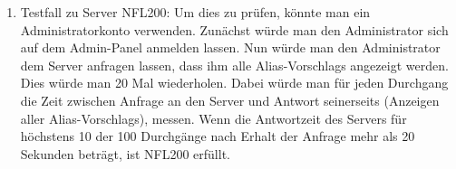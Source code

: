 \begin{enumerate}[label=\textbf{/T\arabic*0/}, align=left]
	\item Testfall zu Server NFL200: Um dies zu prüfen, könnte man ein \Gls{Administrator}konto verwenden. Zunächst würde man den \Gls{Administrator} sich auf dem \Gls{Admin-Panel} anmelden lassen. Nun würde man den \Gls{Administrator} dem \Gls{Server} anfragen lassen, dass ihm alle \Glspl{Alias-Vorschlag} angezeigt werden. Dies würde man 20 Mal wiederholen. Dabei würde man für jeden Durchgang die Zeit zwischen Anfrage an den \Gls{Server} und Antwort seinerseits (Anzeigen aller \Glspl{Alias-Vorschlag}), messen. Wenn die Antwortzeit des \Gls{Server}s für höchstens 10 der 100 Durchgänge nach Erhalt der Anfrage mehr als 20 Sekunden beträgt, ist NFL200 erfüllt.
\end{enumerate}